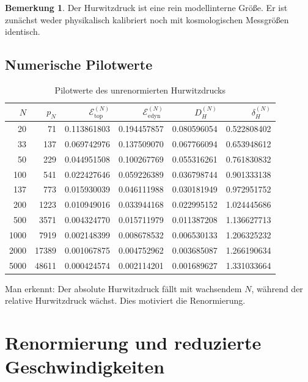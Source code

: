 \documentclass[a4paper,12pt]{article}
\theoremstyle{definition}
\newtheorem{bemerkung}[satz]{Bemerkung}
\numberwithin{equation}{section}
\begin{document}
	\begin{bemerkung}
		Der Hurwitzdruck ist eine rein modellinterne Größe. Er ist zunächst weder physikalisch kalibriert noch mit kosmologischen Messgrößen identisch.
	\end{bemerkung}
	
	\subsection{Numerische Pilotwerte}
	
	\begin{table}[htbp]
		\centering
		\caption{Pilotwerte des unrenormierten Hurwitzdrucks}
		\begin{tabular}{@{}rrrrrr@{}}
			\toprule
			\(N\) & \(p_N\) & \(\mathcal E_{\mathrm{top}}^{(N)}\) & \(\mathcal E_{\mathrm{edyn}}^{(N)}\) & \(D_H^{(N)}\) & \(\delta_H^{(N)}\) \\
			\midrule
			20   & 71    & 0.113861803 & 0.194457857 & 0.080596054 & 0.522808402 \\
			33   & 137   & 0.069742976 & 0.137509070 & 0.067766094 & 0.653948612 \\
			50   & 229   & 0.044951508 & 0.100267769 & 0.055316261 & 0.761830832 \\
			100  & 541   & 0.022427646 & 0.059226389 & 0.036798744 & 0.901333138 \\
			137  & 773   & 0.015930039 & 0.046111988 & 0.030181949 & 0.972951752 \\
			200  & 1223  & 0.010949016 & 0.033944168 & 0.022995152 & 1.024445686 \\
			500  & 3571  & 0.004324770 & 0.015711979 & 0.011387208 & 1.136627713 \\
			1000 & 7919  & 0.002148399 & 0.008678532 & 0.006530133 & 1.206325232 \\
			2000 & 17389 & 0.001067875 & 0.004752962 & 0.003685087 & 1.266190634 \\
			5000 & 48611 & 0.000424574 & 0.002114201 & 0.001689627 & 1.331033664 \\
			\bottomrule
		\end{tabular}
	\end{table}
	
	Man erkennt: Der absolute Hurwitzdruck fällt mit wachsendem \(N\), während der relative Hurwitzdruck wächst. Dies motiviert die Renormierung.
	
	\section{Renormierung und reduzierte Geschwindigkeiten}
	
\end{document}
